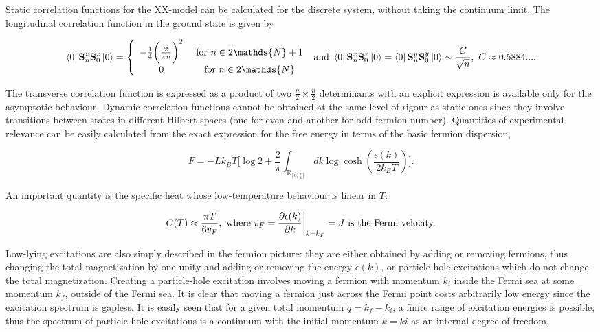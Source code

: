 \documentclass{homework}
\begin{document}
Static correlation functions for the XX-model can be calculated for the discrete system, without taking the continuum limit. The longitudinal correlation function in the ground state is given by 

$$
\bra{0} {\spin}_n^z {\spin}_0^z \ket{0} = \left\{ \begin{array}{cc}
     - \frac{1}{4} \bigg(\frac{2}{\pi n}\bigg)^2 & \textnormal{ for $n \in 2\mathds{N}+1$}  \\
     0  & \textnormal{ for $ n \in 2\mathds{N}$} 
\end{array} \right. \textnormal{ and } \bra{0} {\spin}_n^x {\spin}_0^x \ket{0} = \bra{0} {\spin}_n^y {\spin}_0^y \ket{0} \sim \frac{C}{\sqrt{n}}, \blanky C \approx 0.5884....
$$

The transverse correlation function is expressed as a product of two $\frac{n}{2} \times \frac{n}{2}$ determinants with an explicit expression is available only for the asymptotic behaviour. Dynamic correlation functions cannot be obtained at the same level of rigour as static ones since they involve transitions between states in different Hilbert spaces (one for even and another for odd fermion number). Quantities of experimental relevance can be easily calculated from the exact expression for the free energy in terms of the basic fermion dispersion, 

\begin{equation}
    F = - L k_B T \bigg[\log 2 + \frac{2}{\pi} \int_{\mathds{R}_{[0, \frac{\pi}{2}]}} dk \log \cosh \left(\frac{\epsilon(k)}{2k_B T}\right)\bigg].
\end{equation}

An important quantity is the specific heat whose low-temperature behaviour is linear in $T$:

$$
C(T) \approx \frac{\pi T}{6 v_F}, \textnormal{ where } v_F = \frac{\partial \epsilon(k)}{\partial k}\bigg|_{k = k_F} = J \textnormal{ is the Fermi velocity.} 
$$

Low-lying excitations are also simply described in the fermion picture: they are either obtained by adding or removing fermions, thus changing the total magnetization by one unity and adding or removing the energy $\epsilon(k)$, or particle-hole excitations which do not change the total magnetization. Creating a particle-hole excitation involves moving a fermion with momentum $k_i$ inside the Fermi sea at some momentum $k_f$, outside of the Fermi sea. It is clear that moving a fermion just across the Fermi point costs arbitrarily low energy since the excitation spectrum is gapless. It is easily seen that for a given total momentum $q = k_f - k_i$, a finite range of excitation energies is possible, thus the spectrum of particle-hole excitations is a continuum with the initial momentum $k=ki$ as an internal degree of freedom,
\end{document}

